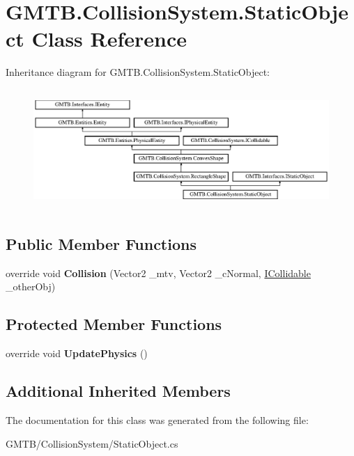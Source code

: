 \hypertarget{class_g_m_t_b_1_1_collision_system_1_1_static_object}{}\section{G\+M\+T\+B.\+Collision\+System.\+Static\+Object Class Reference}
\label{class_g_m_t_b_1_1_collision_system_1_1_static_object}
Inheritance diagram for G\+M\+T\+B.\+Collision\+System.\+Static\+Object\+:\begin{figure}[H]
\begin{center}
\leavevmode
\includegraphics[height=4.609053cm]{class_g_m_t_b_1_1_collision_system_1_1_static_object}
\end{center}
\end{figure}
\subsection*{Public Member Functions}
\begin{DoxyCompactItemize}
\item 
\mbox{\label{class_g_m_t_b_1_1_collision_system_1_1_static_object_a33d9d8892be45f0947a5180e808cb5b4}} 
override void {\bfseries Collision} (Vector2 \+\_\+mtv, Vector2 \+\_\+c\+Normal, \mbox{\hyperlink{interface_g_m_t_b_1_1_collision_system_1_1_i_collidable}{I\+Collidable}} \+\_\+other\+Obj)
\end{DoxyCompactItemize}
\subsection*{Protected Member Functions}
\begin{DoxyCompactItemize}
\item 
\mbox{\label{class_g_m_t_b_1_1_collision_system_1_1_static_object_a677e4512868792c792541ba7d6ba766e}} 
override void {\bfseries Update\+Physics} ()
\end{DoxyCompactItemize}
\subsection*{Additional Inherited Members}


The documentation for this class was generated from the following file\+:\begin{DoxyCompactItemize}
\item 
G\+M\+T\+B/\+Collision\+System/Static\+Object.\+cs\end{DoxyCompactItemize}

